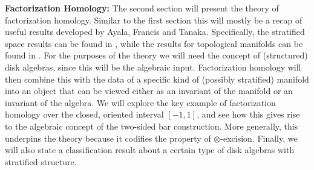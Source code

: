 \documentclass[../text.tex]{subfiles}
\begin{document}
\textbf{ Factorization Homology:} The second section will present the theory of factorization homology. Similar to the first section this will mostly be a recap of useful results developed by Ayala, Francis and Tanaka. Specifically, the stratified space results can be found in \cite{aft_fhstrat}, while the results for topological manifolds can be found in \cite{af_fhtop}. For the purposes of the theory we will need the concept of (structured) disk algebras, since this will be the algebraic input. Factorization homology will then combine this with the data of a specific kind of (possibly stratified) manifold into an object that can be viewed either as an invariant of the manifold or an invariant of the algebra. We will explore the key example of factorization homology over the closed, oriented interval $[-1,1]$, and see how this gives rise to the algebraic concept of the two-sided bar construction. More generally, this underpins the theory because it codifies the property of $\otimes$-excision. Finally, we will also state a classification result \cite[prop.4.8]{aft_fhstrat} about a certain type of disk algebras with stratified structure.
\end{document}
